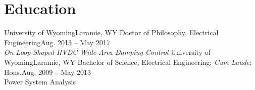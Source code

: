\section{Education}
  \resumeSubHeadingListStart
    \resumeSubheading
      {University of Wyoming}{Laramie, WY}
      {Doctor of Philosophy, Electrical Engineering}{Aug. 2013 -- May 2017} \\
      \resumeItemListStart
         {\textit{On Loop-Shaped HVDC Wide-Area Damping Control}}
      \resumeItemListEnd
    \resumeSubheading  
      {University of Wyoming}{Laramie, WY}
      {Bachelor of Science, Electrical Engineering; \textit{Cum Laude}; Hons.}{Aug. 2009 -- May 2013} \\
      \resumeItemListStart
         {Power System Analysis}
      \resumeItemListEnd
  \resumeSubHeadingListEnd